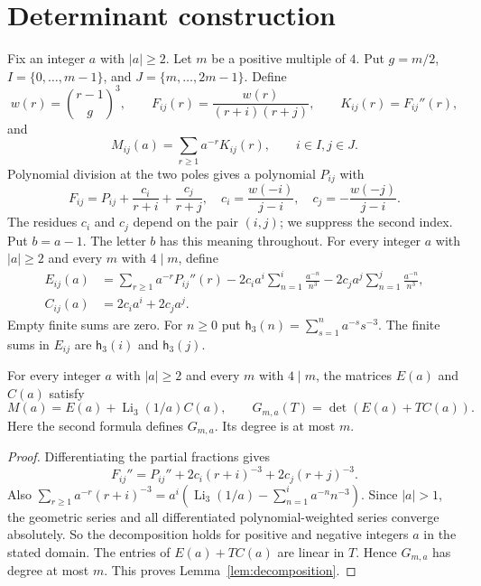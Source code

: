 \section{Determinant construction}\label{sec:determinant}

Fix an integer \(a\) with \(|a| \ge 2\). Let \(m\) be a positive multiple of \(4\). Put \(g=m/2\), \(I=\{0,\ldots,m-1\}\), and \(J=\{m,\ldots,2m-1\}\). Define
\[
 w(r)=\binom{r-1}{g}^{3},\qquad
 F_{ij}(r)=\frac{w(r)}{(r+i)(r+j)},\qquad K_{ij}(r)=F_{ij}''(r),
\]
and
\[
 M_{ij}(a)=\sum_{r\geq1}a^{-r}K_{ij}(r),\qquad i\in I, j\in J.
\]
Polynomial division at the two poles gives a polynomial \(P_{ij}\) with
\[
 F_{ij}=P_{ij}+\frac{c_i}{r+i}+\frac{c_j}{r+j},\quad
 c_i=\frac{w(-i)}{j-i},\quad c_j=-\frac{w(-j)}{j-i}.
\]
The residues \(c_i\) and \(c_j\) depend on the pair \((i,j)\); we suppress the second index. Put \(b=a-1\). The letter \(b\) has this meaning throughout. For every integer \(a\) with \(|a|\ge2\) and every \(m\) with \(4\mid m\), define
\[
 \begin{aligned}
 E_{ij}(a)&=\sum_{r\ge1}a^{-r}P_{ij}''(r)
 -2c_i a^i\sum_{n=1}^{i}\frac{a^{-n}}{n^3}
 -2c_j a^j\sum_{n=1}^{j}\frac{a^{-n}}{n^3},\\
 C_{ij}(a)&=2c_i a^i+2c_j a^j.
 \end{aligned}
\]
Empty finite sums are zero. For \(n\ge0\) put \(\mathsf h_3(n)=\sum_{s=1}^n a^{-s}s^{-3}\). The finite sums in \(E_{ij}\) are \(\mathsf h_3(i)\) and \(\mathsf h_3(j)\).

\begin{lemma}\label{lem:decomposition}
For every integer \(a\) with \(|a|\ge2\) and every \(m\) with \(4\mid m\), the matrices \(E(a)\) and \(C(a)\) satisfy
\[
 M(a)=E(a)+\operatorname {Li}_3(1/a)C(a),\qquad
 G_{m,a}(T)=\det(E(a)+TC(a)).
\]
Here the second formula defines \(G_{m,a}\). Its degree is at most \(m\).
\end{lemma}

\begin{proof}
Differentiating the partial fractions gives
\[
 F_{ij}''=P_{ij}''+2c_i(r+i)^{-3}+2c_j(r+j)^{-3}.
\]
Also \(\sum_{r\ge1}a^{-r}(r+i)^{-3} =a^i(\operatorname{Li}_3(1/a)-\sum_{n=1}^i a^{-n}n^{-3})\). Since \(|a|>1\), the geometric series and all differentiated polynomial-weighted series converge absolutely. So the decomposition holds for positive and negative integers \(a\) in the stated domain. The entries of \(E(a)+TC(a)\) are linear in \(T\). Hence \(G_{m,a}\) has degree at most \(m\). This proves Lemma~\ref{lem:decomposition}.
\end{proof}

